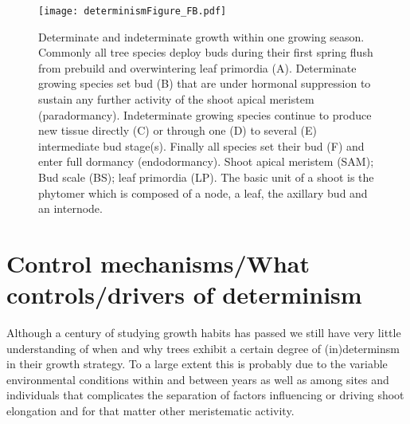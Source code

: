 \documentclass{article}
\begin{document}
	
								\begin{figure}
								\centering
								\texttt{[image: determinismFigure\_FB.pdf]} 
								\caption{Determinate and indeterminate growth within one growing season. Commonly all tree species deploy buds during their first spring flush from prebuild and overwintering leaf primordia (A). Determinate growing species set bud (B) that are under hormonal suppression to sustain any further activity of the shoot apical meristem (paradormancy). Indeterminate growing species continue to produce new tissue directly (C) or through one (D) to several (E) intermediate bud stage(s). Finally all species set their bud (F) and enter full dormancy (endodormancy). Shoot apical meristem (SAM); Bud scale (BS); leaf primordia (LP). The basic unit of a shoot is the phytomer which is composed of a node, a leaf, the axillary bud and an internode.}
								\label{fig:fig_2xxx}
								\end{figure}
	
\section*{Control mechanisms/What controls/drivers of determinism}
Although a century of studying growth habits has passed we still have very little understanding of when and why trees exhibit a certain degree of (in)determinsm in their growth strategy. To a large extent this is probably due to the variable environmental conditions within and between years as well as among sites and individuals that complicates the separation of factors influencing or driving shoot elongation and for that matter other meristematic activity.
\end{document}
